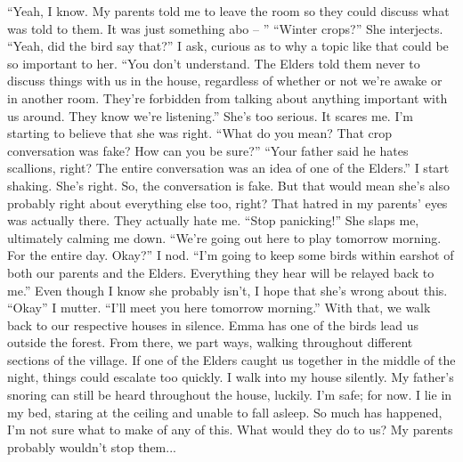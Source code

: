 \documentclass[openany, 12pt]{book}
\newcommand\tab[1][1cm]{\hspace*{#1}}
\begin{document}
\newline
\tab
``Yeah, I know. My parents told me to leave the room so they could discuss what was told to them. It was just something abo -- '' 
\newline
\tab
``Winter crops?'' She interjects.
\newline
\tab
``Yeah, did the bird say that?'' I ask, curious as to why a topic like that could be so important to her.
\newline
\tab
``You don’t understand. The Elders told them never to discuss things with us in the house, regardless of whether or not we’re awake or in another room. They’re forbidden from talking about anything important with us around. They know we’re listening.'' She’s too serious. It scares me. I’m starting to believe that she was right.
\newline
\tab
``What do you mean? That crop conversation was fake? How can you be sure?''
\newline
\tab
``Your father said he hates scallions, right? The entire conversation was an idea of one of the Elders.'' I start shaking. She’s right. So, the conversation is fake. But that would mean she’s also probably right about everything else too, right? That hatred in my parents’ eyes was actually there. They actually hate me. ``Stop panicking!'' She slaps me, ultimately calming me down. ``We’re going out here to play tomorrow morning. For the entire day. Okay?'' I nod. ``I’m going to keep some birds within earshot of both our parents and the Elders. Everything they hear will be relayed back to me.'' Even though I know she probably isn't, I hope that she's wrong about this.
\newline
\tab
``Okay'' I mutter. ``I’ll meet you here tomorrow morning.''
\newline
\tab
With that, we walk back to our respective houses in silence. Emma has one of the birds lead us outside the forest. From there, we part ways, walking throughout different sections of the village. If one of the Elders caught us together in the middle of the night, things could escalate too quickly. I walk into my house silently. My father’s snoring can still be heard throughout the house, luckily. I’m safe; for now. I lie in my bed, staring at the ceiling and unable to fall asleep. So much has happened, I’m not sure what to make of any of this. What would they do to us? My parents probably wouldn’t stop them...
\newline
\tab
\end{document}
